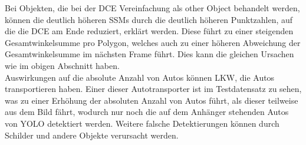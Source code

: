 {	Bei Objekten, die bei der DCE Vereinfachung als \glqq other Object\grqq{} behandelt werden, können die deutlich höheren SSMs durch die deutlich höheren Punktzahlen, auf die die DCE am Ende reduziert, erklärt werden. Diese führt zu einer steigenden Gesamtwinkelsumme pro Polygon, welches auch zu einer höheren Abweichung der Gesamtwinkelsumme im nächsten Frame führt. Dies kann die gleichen Ursachen wie im obigen Abschnitt haben. \\
	
	Auswirkungen auf die absolute Anzahl von Autos können LKW, die Autos transportieren haben. Einer dieser Autotransporter ist im Testdatensatz zu sehen, was zu einer Erhöhung der absoluten Anzahl von Autos führt, als dieser teilweise aus dem Bild fährt, wodurch nur noch die auf dem Anhänger stehenden Autos von YOLO detektiert werden. Weitere falsche Detektierungen können durch Schilder und andere Objekte verursacht werden. \\


}
		



